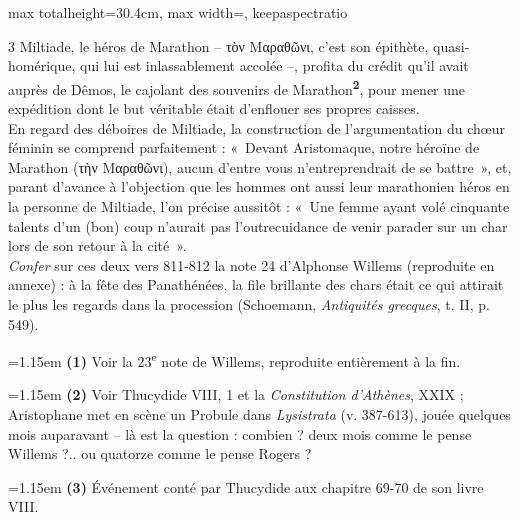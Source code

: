 \documentclass[11pt,twoside]{book}
\newcommand{\italique}[1]{\textit{#1}}
\newcommand{\nieme}[1]{#1\textsuperscript{e}}
\newcommand{\marqueur}[1]{\textsuperscript{\color{rubricRed}\textbf{#1}}}
\begin{document}
\begin{adjustbox}{max totalheight=30.4cm, max width=\textwidth, keepaspectratio}
\begin{minipage}{\textwidth}
{\begin{multicols}{3}
\noindent Miltiade, le héros de Marathon -- τὸν Μαραθῶνι, c'est son épithète, quasi-homérique, qui lui est inlassablement accolée --, profita du crédit qu'il avait auprès de Dêmos, le cajolant des souvenirs de Marathon\marqueur{2}, pour mener une expédition dont le but véritable était d'enflouer ses propres caisses.\\ En regard des déboires de Miltiade, la construction de l'argumentation du chœur féminin se comprend parfaitement : «~Devant Aristomaque, notre héroïne de Marathon (τὴν Μαραθῶνι), aucun d'entre vous n'entreprendrait de se battre~», et, parant d'avance à l'objection que les hommes ont aussi leur marathonien héros en la personne de Miltiade, l'on précise aussitôt : «~Une femme ayant volé cinquante talents d'un (bon) coup n'aurait pas l'outrecuidance de venir parader sur un char lors de son retour à la cité~».\\ \italique{Confer} sur ces deux vers 811-812 la note 24 d'Alphonse Willems (reproduite en annexe) : à la fête des Panathénées, la file brillante des chars était ce qui attirait le plus les regards dans la procession (Schoemann, \italique{Antiquités grecques}, t. II, p. 549).
\par\vspace{1.5pt}
\par\vspace{1.2pt}\par\nopagebreak\vspace{1pt}\noindent\hangindent=1.15em {\color{sepiaNote}\textbf{(1)}} Voir la \nieme{23} note de Willems, reproduite entièrement à la fin.
\par\vspace{1.5pt}
\noindent\hangindent=1.15em {\color{sepiaNote}\textbf{(2)}} Voir Thucydide VIII, 1 et la \italique{Constitution d'Athènes}, XXIX ; Aristophane met en scène un Probule dans \italique{Lysistrata} (v. 387-613), jouée quelques mois auparavant -- là est la question : combien ? deux mois comme le pense Willems ?.. ou quatorze comme le pense Rogers ?
\par\vspace{1.5pt}
\noindent\hangindent=1.15em {\color{sepiaNote}\textbf{(3)}} Événement conté par Thucydide aux chapitre 69-70 de son livre VIII.
\par\vspace{1.5pt}

\end{multicols}}
\end{minipage}
\end{adjustbox}
\end{document}
